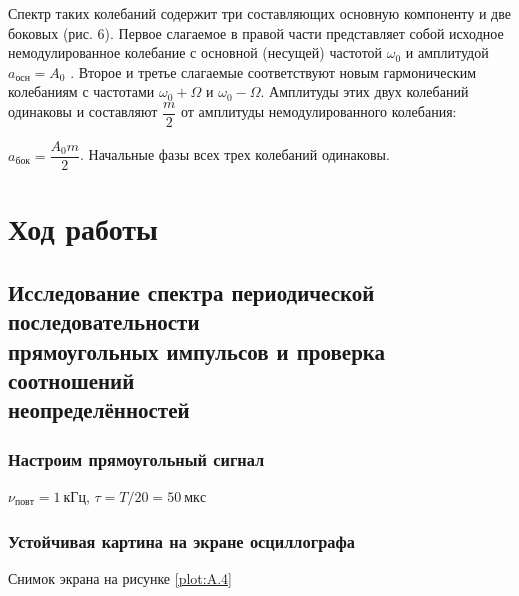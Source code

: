 \documentclass[a4paper, 12pt]{article}
\begin{document}
                Спектр таких колебаний содержит три составляющих  основную компоненту и две боковых (рис. 6). Первое слагаемое в правой части представляет собой исходное немодулированное колебание с основной (несущей) частотой $\omega_{0}$ и амплитудой $a_{осн} = A_{0}$ . Второе и третье слагаемые соответствуют новым гармоническим колебаниям с частотами $\omega_{0} + \Omega$ и $\omega_{0} - \Omega$. Амплитуды этих двух колебаний одинаковы и составляют $\dfrac{m}{2}$ от амплитуды немодулированного колебания:

                $a_{бок} = \dfrac{A_{0}m}{2}$. Начальные фазы всех трех колебаний одинаковы.

    \section{Ход работы}

        \subsection{Исследование спектра периодической последовательности\\прямоугольных импульсов и проверка соотношений\\неопределённостей}

            \setcounter{subsubsection}{2}
            \subsubsection{Настроим прямоугольный сигнал}

                $\nu_{повт} = 1~кГц$, $\tau = T/20 = 50~мкс$

            \subsubsection{Устойчивая картина на экране осциллографа}

                Снимок экрана на рисунке \ref{plot:A.4}
\end{document}
